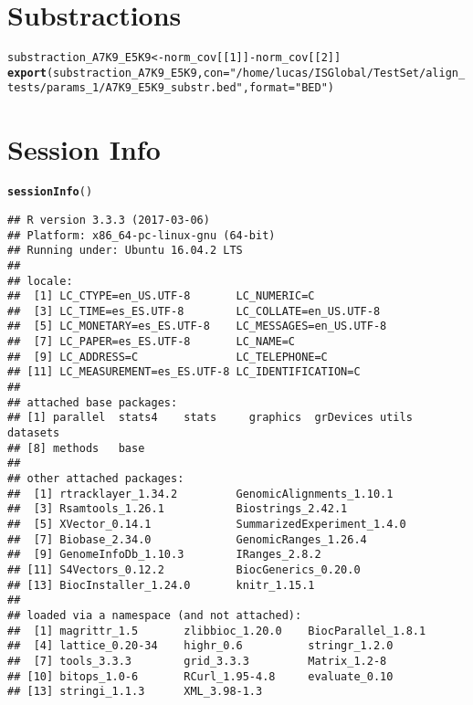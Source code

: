 \documentclass{article}\usepackage[]{graphicx}\usepackage[]{color}
\makeatletter
\newcommand{\hlnum}[1]{\textcolor[rgb]{0.686,0.059,0.569}{#1}}%
\newcommand{\hlstr}[1]{\textcolor[rgb]{0.192,0.494,0.8}{#1}}%
\newcommand{\hlopt}[1]{\textcolor[rgb]{0,0,0}{#1}}%
\newcommand{\hlstd}[1]{\textcolor[rgb]{0.345,0.345,0.345}{#1}}%
\newcommand{\hlkwb}[1]{\textcolor[rgb]{0.69,0.353,0.396}{#1}}%
\newcommand{\hlkwc}[1]{\textcolor[rgb]{0.333,0.667,0.333}{#1}}%
\newcommand{\hlkwd}[1]{\textcolor[rgb]{0.737,0.353,0.396}{\textbf{#1}}}%
\newenvironment{kframe}{%
 \def\at@end@of@kframe{}%
 \ifinner\ifhmode%
  \def\at@end@of@kframe{\end{minipage}}%
  \begin{minipage}{\columnwidth}%
 \fi\fi%
 \def\FrameCommand##1{\hskip\@totalleftmargin \hskip-\fboxsep
 \colorbox{shadecolor}{##1}\hskip-\fboxsep
     \hskip-\linewidth \hskip-\@totalleftmargin \hskip\columnwidth}%
 \MakeFramed {\advance\hsize-\width
   \@totalleftmargin\z@ \linewidth\hsize
   \@setminipage}}%
 {\par\unskip\endMakeFramed%
 \at@end@of@kframe}
\newenvironment{knitrout}{}{} %
\makeatother
\begin{document}
\section{Substractions}%

\begin{knitrout}
\color{fgcolor}\begin{kframe}
\begin{alltt}
\hlstd{substraction_A7K9_E5K9} \hlkwb{<-} \hlstd{norm_cov[[}\hlnum{1}\hlstd{]]} \hlopt{-} \hlstd{norm_cov[[}\hlnum{2}\hlstd{]]}
\hlkwd{export}\hlstd{(substraction_A7K9_E5K9,} \hlkwc{con} \hlstd{=} \hlstr{"/home/lucas/ISGlobal/TestSet/align_tests/params_1/A7K9_E5K9_substr.bed"}\hlstd{,} \hlkwc{format} \hlstd{=} \hlstr{"BED"}\hlstd{)}
\end{alltt}
\end{kframe}
\end{knitrout}

\section{Session Info}%

\begin{knitrout}
\color{fgcolor}\begin{kframe}
\begin{alltt}
\hlkwd{sessionInfo}\hlstd{()}
\end{alltt}
\begin{verbatim}
## R version 3.3.3 (2017-03-06)
## Platform: x86_64-pc-linux-gnu (64-bit)
## Running under: Ubuntu 16.04.2 LTS
## 
## locale:
##  [1] LC_CTYPE=en_US.UTF-8       LC_NUMERIC=C              
##  [3] LC_TIME=es_ES.UTF-8        LC_COLLATE=en_US.UTF-8    
##  [5] LC_MONETARY=es_ES.UTF-8    LC_MESSAGES=en_US.UTF-8   
##  [7] LC_PAPER=es_ES.UTF-8       LC_NAME=C                 
##  [9] LC_ADDRESS=C               LC_TELEPHONE=C            
## [11] LC_MEASUREMENT=es_ES.UTF-8 LC_IDENTIFICATION=C       
## 
## attached base packages:
## [1] parallel  stats4    stats     graphics  grDevices utils     datasets 
## [8] methods   base     
## 
## other attached packages:
##  [1] rtracklayer_1.34.2         GenomicAlignments_1.10.1  
##  [3] Rsamtools_1.26.1           Biostrings_2.42.1         
##  [5] XVector_0.14.1             SummarizedExperiment_1.4.0
##  [7] Biobase_2.34.0             GenomicRanges_1.26.4      
##  [9] GenomeInfoDb_1.10.3        IRanges_2.8.2             
## [11] S4Vectors_0.12.2           BiocGenerics_0.20.0       
## [13] BiocInstaller_1.24.0       knitr_1.15.1              
## 
## loaded via a namespace (and not attached):
##  [1] magrittr_1.5       zlibbioc_1.20.0    BiocParallel_1.8.1
##  [4] lattice_0.20-34    highr_0.6          stringr_1.2.0     
##  [7] tools_3.3.3        grid_3.3.3         Matrix_1.2-8      
## [10] bitops_1.0-6       RCurl_1.95-4.8     evaluate_0.10     
## [13] stringi_1.1.3      XML_3.98-1.3
\end{verbatim}
\end{kframe}
\end{knitrout}
\end{document}
